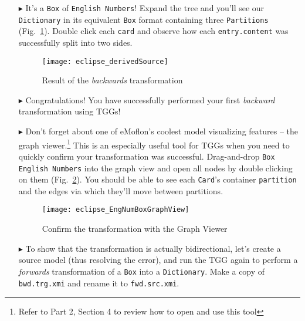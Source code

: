 \begin{itemize}
\item[$\blacktriangleright$] It's a \texttt{Box} of \texttt{English Numbers}! Expand the tree and you'll see our \texttt{Dictionary} in its equivalent
\texttt{Box} format containing three \texttt{Par\-ti\-tions} (Fig.~\ref{eclipse:derivedBOX}). Double click each \texttt{card} and observe how each
\texttt{entry.content} was successfully split into two sides.

\vspace{0.5cm}

\begin{figure}[htbp]
\begin{center}
  \texttt{[image: eclipse\_derivedSource]}
  \caption{Result of the \emph{backwards} transformation}
  \label{eclipse:derivedBOX}
\end{center}
\end{figure}

\vspace{-0.5cm}

\item[$\blacktriangleright$] Congratulations! You have successfully performed your first \emph{backward} transformation using TGGs!

\newpage

\item[$\blacktriangleright$] Don't forget about one of eMoflon's coolest model visualizing features -- the graph viewer.\footnote{Refer to Part 2, Section 4 to
review how to open and use this tool} This is an especially useful tool for TGGs when you need to quickly confirm your transformation was successful.
Drag-and-drop \texttt{Box English Numbers} into the graph view and open all nodes by double clicking on them (Fig.~\ref{eclipse:graphView}). You should be able to see each \texttt{Card}'s container
\texttt{partition} and the edges via which they'll move between partitions.

\vspace{0.5cm}

\begin{figure}[htb]
\begin{center}
  \texttt{[image: eclipse\_EngNumBoxGraphView]}
  \caption{Confirm the transformation with the Graph Viewer}
  \label{eclipse:graphView}
\end{center}
\end{figure}

\vspace{0.5cm}

\item[$\blacktriangleright$] To show that the transformation is actually bidirectional, let's create a source model (thus resolving the error), and run
the TGG again to perform a \emph{forwards} transformation of a \texttt{Box} into a \texttt{Dictionary}. Make a copy of \texttt{bwd.trg.xmi} and rename
it to \texttt{fwd.src.xmi}.


\end{itemize}
